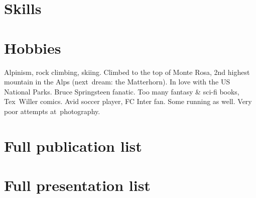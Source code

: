 \vspace{-0.32cm}

\section{Skills}

\vspace{-0.32cm}
\section{Hobbies}
Alpinism, rock climbing, skiing. Climbed to the top of Monte Rosa, 2nd highest mountain in the Alps (next~dream: the Matterhorn). In love with the US National Parks. Bruce Springsteen fanatic.  Too many fantasy \& sci-fi books, Tex~Willer comics. Avid soccer player, FC Inter fan. Some running as well. Very poor attempts at~photography.


\pagebreak
\section{Full publication list}\vspace{0.2cm} 



\pagebreak
\section{Full presentation list}\vspace{0.2cm} 




